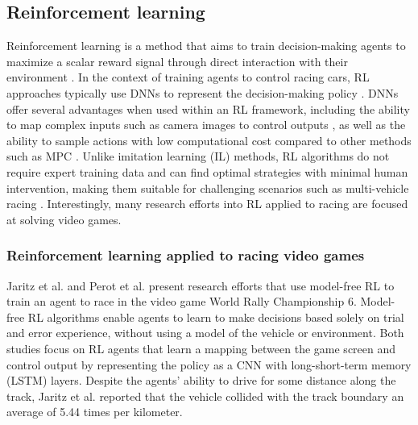 \subsection{Reinforcement learning}
\label{sec:reinforcement_learning}
Reinforcement learning is a method that aims to train decision-making agents to maximize a scalar reward signal through direct interaction with their environment \cite{Plaat_2022}. 
In the context of training agents to control racing cars, RL approaches typically use DNNs to represent the decision-making policy \cite{Betz2021}. 
DNNs offer several advantages when used within an RL framework, including the ability to map complex inputs such as camera images to control outputs \cite{hsu2022, Schwarting2021, Jaritz2018, Perot2017}, as well as the ability to sample actions with low computational cost compared to other methods such as MPC \cite{Ghignone2022}. 
Unlike imitation learning (IL) methods, RL algorithms do not require expert training data and can find optimal strategies with minimal human intervention, making them suitable for challenging scenarios such as multi-vehicle racing \cite{Song2021, Wurman2022}. 
Interestingly, many research efforts into RL applied to racing are focused at solving video games.

\subsubsection*{Reinforcement learning applied to racing video games}

Jaritz et al. \cite{Jaritz2018} and Perot et al. \cite{Perot2017} present research efforts that use model-free RL to train an agent to race in the video game World Rally Championship $6$. 
Model-free RL algorithms enable agents to learn to make decisions based solely on trial and error experience, without using a model of the vehicle or environment.
Both studies focus on RL agents that learn a mapping between the game screen and control output by representing the policy as a CNN with long-short-term memory (LSTM) layers. 
Despite the agents' ability to drive for some distance along the track, Jaritz et al. \cite{Jaritz2018} reported that the vehicle collided with the track boundary an average of 5.44 times per kilometer.

